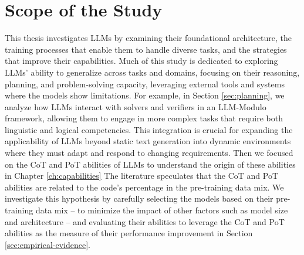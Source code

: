 \section*{Scope of the Study}
This thesis investigates LLMs by examining their foundational architecture, the training processes that enable them to handle diverse tasks, and the strategies that improve their capabilities.
Much of this study is dedicated to exploring LLMs' ability to generalize across tasks and domains, focusing on their reasoning, planning, and problem-solving capacity, leveraging external tools and systems where the models show limitations.
For example, in Section \ref{sec:planning}, we analyze how LLMs interact with solvers and verifiers in an LLM-Modulo framework, allowing them to engage in more complex tasks that require both linguistic and logical competencies.
This integration is crucial for expanding the applicability of LLMs beyond static text generation into dynamic environments where they must adapt and respond to changing requirements.
Then we focused on the CoT and PoT abilities of LLMs to understand the origin of these abilities in Chapter \ref{ch:capabilities}
The literature speculates that the CoT and PoT abilities are related to the code's percentage in the pre-training data mix.
We investigate this hypothesis by carefully selecting the models based on their pre-training data mix -- to minimize the impact of other factors such as model size and architecture -- and evaluating their abilities to leverage the CoT and PoT abilities as the measure of their performance improvement in Section \ref{sec:empirical-evidence}.